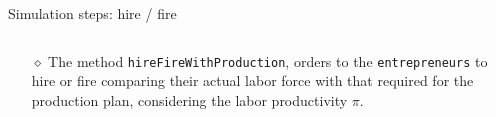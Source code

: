\documentclass[9pt]{beamer}
\begin{document}
\begin{frame}[fragile]{Simulation steps: hire / fire}

\begin{columns}[T]
\begin{column}{.7\textwidth}
\begin{block}{}

\begin{itemize}

\item[$\diamond$] The method \verb"hireFireWithProduction", orders to the \verb"entrepreneurs" to hire or fire comparing their actual labor force with that required for the production plan, considering the labor productivity  $\pi$.

\end{itemize}
     
\end{block}
\end{column}

 \begin{column}{.3\textwidth}
 \vspace{-8.05\baselineskip}
 \begin{block}{}
  \end{block}
  \end{column}
    
\end{columns}

\end{frame}
\end{document}
